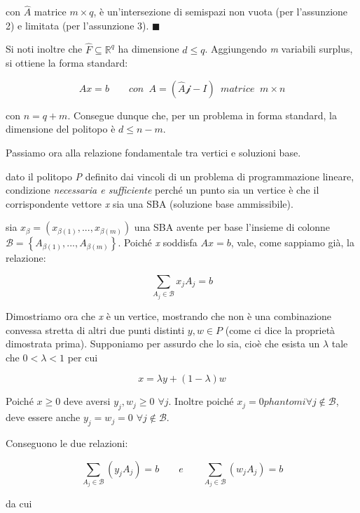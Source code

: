 \documentclass[11pt]{book}
\begin{document}
con $\hat A$ matrice $ m \times q$, \`e un'intersezione di semispazi
non vuota (per l'assunzione 2) e limitata (per l'assunzione 3). $\blacksquare$
\newline

\vspace{11pt}
Si noti inoltre che $\hat F \subseteq \mathbb{R}^q$ ha dimensione $d
\leq q$. Aggiungendo {\em m} variabili surplus, si ottiene la forma
standard:

$$Ax=b \qquad con \phantom{a} A=(\hat A \mathcal j - I) \phantom{a} matrice \phantom{a} m
\times n$$ 

con $n=q+m$. Consegue dunque che, per un problema in forma standard,
la dimensione del politopo \`e $d \leq n-m$.

Passiamo ora alla relazione fondamentale tra vertici e soluzioni base.

\par{} dato il politopo {\em P} definito dai
vincoli di un problema di programmazione lineare, condizione {\em
  necessaria e sufficiente} perch\'e un punto sia un vertice \`e che
il corrispondente vettore {\em x} sia una SBA (soluzione base
ammissibile).

\par{} sia
$x_{\beta}=(x_{\beta(1)},...,x_{\beta(m)})$ una SBA avente per base
l'insieme di colonne $\mathcal B = \left\{
A_{\beta(1)},...,A_{\beta(m)}\right\}$. Poich\'e {\em x} soddisfa
$Ax=b$, vale, come sappiamo gi\`a, la relazione:

$$\sum_{A_j \in \mathcal B} x_jA_j =b$$

Dimostriamo ora che {\em x} \`e un vertice, mostrando che non \`e una
combinazione convessa stretta di altri due punti distinti $ y, w
  \in P$ (come ci dice la propriet\`a dimostrata prima). Supponiamo per
assurdo che lo sia, cio\`e che esista un $\lambda$ tale che
$0 < \lambda <1$ per cui 

$$x = \lambda y + (1-\lambda)w$$

Poich\'e $x \geq 0$ deve aversi $y_j, w_j \geq 0 \phantom{i} \forall j
$. Inoltre poich\'e $x_j=0 phantom{i} \forall j \notin \mathcal B$,
deve essere anche $y_j = w_j = 0 \phantom{i} \forall j \notin \mathcal
B$.

Conseguono le due relazioni:

$$\sum_{A_j \in \mathcal B}(y_jA_j)=b \qquad e \qquad \sum_{A_j \in \mathcal B}(w_jA_j)=b$$

da cui
\end{document}
